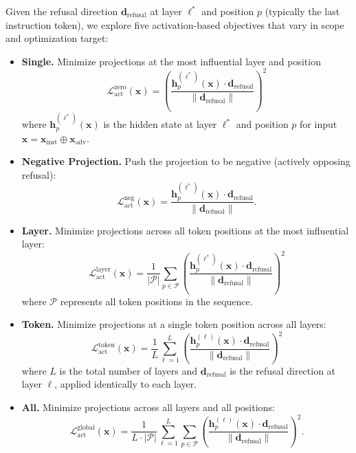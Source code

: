 \documentclass[letterpaper]{article} %
\begin{document}
Given the refusal direction $\mathbf{d}_{\text{refusal}}$ at layer $\ell^*$ and position $p$ (typically the last instruction token), we explore five activation-based objectives that vary in scope and optimization target:
\begin{itemize}
    \item \textbf{Single.} Minimize projections at the most influential layer and position
\begin{equation}
    \mathcal{L}_{\text{act}}^{\text{zero}}(\mathbf{x}) = \left( \frac{\mathbf{h}^{(\ell^*)}_p(\mathbf{x}) \cdot \mathbf{d}_{\text{refusal}}}{\|\mathbf{d}_{\text{refusal}}\|} \right)^2
\end{equation}
where $\mathbf{h}^{(\ell^*)}_p(\mathbf{x})$ is the hidden state at layer $\ell^*$ and position $p$ for input $\mathbf{x} = \mathbf{x}_{\text{inst}} \oplus \mathbf{x}_{\text{adv}}$.

    \item \textbf{Negative Projection.} Push the projection to be negative (actively opposing refusal):
\begin{equation}
    \mathcal{L}_{\text{act}}^{\text{neg}}(\mathbf{x}) = \frac{\mathbf{h}^{(\ell^*)}_p(\mathbf{x}) \cdot \mathbf{d}_{\text{refusal}}}{\|\mathbf{d}_{\text{refusal}}\|}.
\end{equation}

    \item \textbf{Layer.} Minimize projections across all token positions at the most influential layer:
\begin{equation}
    \mathcal{L}_{\text{act}}^{\text{layer}}(\mathbf{x}) = \frac{1}{|\mathcal{P}|} \sum_{p \in \mathcal{P}} \left( \frac{\mathbf{h}^{(\ell^*)}_p(\mathbf{x}) \cdot \mathbf{d}_{\text{refusal}}}{\|\mathbf{d}_{\text{refusal}}\|} \right)^2
\end{equation}
where $\mathcal{P}$ represents all token positions in the sequence.

    \item \textbf{Token.} Minimize projections at a single token position across all layers:
\begin{equation}
    \mathcal{L}_{\text{act}}^{\text{token}}(\mathbf{x}) = \frac{1}{L} \sum_{\ell=1}^{L} \left( \frac{\mathbf{h}^{(\ell)}_p(\mathbf{x}) \cdot \mathbf{d}_{\text{refusal}}}{\|\mathbf{d}_{\text{refusal}}\|} \right)^2
\end{equation}
where $L$ is the total number of layers and $\mathbf{d}_{\text{refusal}}$ is the refusal direction at layer $\ell$, applied identically to each layer.

    \item  \textbf{All.} Minimize projections across all layers and all positions:
\begin{equation}
    \mathcal{L}_{\text{act}}^{\text{global}}(\mathbf{x}) = \frac{1}{L \cdot |\mathcal{P}|} \sum_{\ell=1}^{L} \sum_{p \in \mathcal{P}} \left( \frac{\mathbf{h}^{(\ell)}_p(\mathbf{x}) \cdot \mathbf{d}_{\text{refusal}}}{\|\mathbf{d}_{\text{refusal}}\|} \right)^2.
\end{equation}
\end{itemize}
\end{document}
